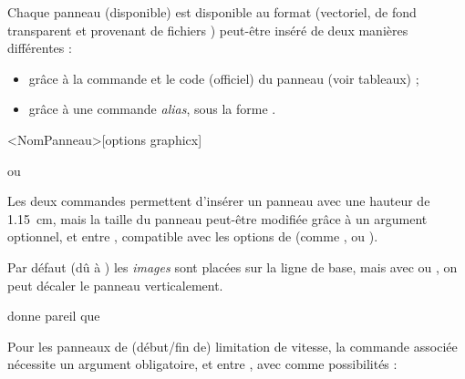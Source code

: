 \documentclass[french,11pt,a4paper]{article}
\begin{document}
Chaque panneau (disponible) est disponible au format  (vectoriel, de fond transparent et provenant de fichiers ) peut-être inséré de deux manières différentes :

\begin{itemize}
	\item grâce à la commande  et le code (officiel) du panneau (voir tableaux) ;
	\item grâce à une commande \textit{alias}, sous la forme .
\end{itemize}

\begin{codehigh}[language=latex/latex3,style/main=cyan!5,style/code=cyan!5]
\pr<NomPanneau>[options graphicx]                   %
\end{codehigh}

\begin{demohigh}[language=latex/latex3,style/main=cyan!5,style/code=cyan!5,style/demo=cyan!5]
 ou \prChausRetG
\end{demohigh}

Les deux commandes permettent d'insérer un panneau avec une hauteur de 1.15~cm, mais la taille du panneau peut-être modifiée grâce à un argument optionnel, et entre \MontreCode{[...]}, compatible avec les options de  (comme ,  ou ).

\medskip

Par défaut (dû à ) les \textit{images} sont placées sur la ligne de base, mais avec  ou , on peut décaler le panneau verticalement.

\begin{demohigh}[language=latex/latex3,style/main=cyan!5,style/code=cyan!5,style/demo=cyan!5]
 donne pareil que \raisebox{-0.2\height}{\prInterdTournD[height=2ex]}
\end{demohigh}

\medskip

Pour les panneaux de (début/fin de) limitation de vitesse, la commande associée nécessite un argument obligatoire, et entre , avec comme possibilités  :
\end{document}
